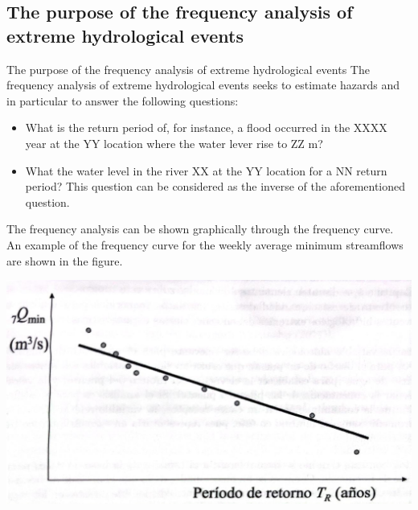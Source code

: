\documentclass[8pt]{beamer}
\renewcommand{\emph}[1]{\textcolor{myorange}{#1}}
\begin{document}
\subsection{The purpose of the frequency analysis of extreme hydrological events}
\begin{frame}{The purpose of the frequency analysis of extreme hydrological events}
    The frequency analysis of extreme hydrological events seeks to estimate hazards and in particular to answer the following questions:
    \begin{itemize}
        \item What is the \emph{return period} of, for instance, a flood occurred in the XXXX year at the YY location where the water lever rise to ZZ m? 
        \item What the water level in the river XX at the YY location for a NN return period? This question can be considered as the inverse of the aforementioned question.
    \end{itemize}
    The frequency analysis can be shown graphically through the \alert{frequency curve}. An example of the frequency curve for the weekly average minimum streamflows are shown in the figure.

\centering
\includegraphics[width=0.95\linewidth]{fiM23.jpeg}  %
\end{frame}
\end{document}
